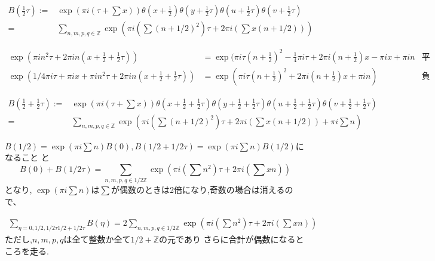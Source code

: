 \documentclass[uplatex,b5j,11pt]{jsbook}
\begin{document}
\begin{align*}
B\left(\frac{1}{2}\tau\right) := & \exp\left(\pi i (\tau + \sum x)\right)\theta(x+\frac{1}{2})\theta(y+\frac{1}{2}\tau)\theta(u+\frac{1}{2}\tau)\theta(v+\frac{1}{2}\tau) \\
 = &\sum_{n,m,p,q \in \mathbb{Z}} \exp\left( \pi i \left(\sum (n+1/2)^2 \right) \tau + 2 \pi i \left(\sum x(n+ 1/2) \right) \right)
\end{align*}

\begin{align*}
\exp( \pi i n^2 \tau + 2 \pi i n(x+\frac{1}{2}+\frac{1}{2}\tau)) & = \exp(\pi i \tau(n+\frac{1}{2})^2 - \frac{1}{4} \pi i \tau  + 2\pi i (n+ \frac{1}{2})x - \pi i x + \pi in & \mbox{平方完成}\\
\exp(1/4 \pi i \tau + \pi i x +  \pi i n^2 \tau + 2 \pi i n(x+ \frac{1}{2}+\frac{1}{2}\tau)) & = \exp(\pi i \tau(n+ \frac{1}{2})^2   + 2\pi i (n+ \frac{1}{2})x  + \pi in) & \mbox{負の項を移項}
\end{align*}

\begin{align*}
B\left( \frac{1}{2}+\frac{1}{2}\tau\right) := & \exp\left(\pi i (\tau + \sum x)\right)\theta(x+\frac{1}{2} + \frac{1}{2}\tau)\theta(y+\frac{1}{2}+\frac{1}{2}\tau)\theta(u+\frac{1}{2}+\frac{1}{2}\tau)\theta(v+\frac{1}{2}+\frac{1}{2}\tau) \\
 = &\sum_{n,m,p,q \in \mathbb{Z}} \exp\left( \pi i \left(\sum (n+1/2)^2 \right) \tau + 2 \pi i \left(\sum x(n+ 1/2) \right) +  \pi i \sum n \right)
\end{align*}

$B(1/2) = \exp(\pi i \sum n)B(0), B(1/2+1/2 \tau) =  \exp(\pi i \sum n)B(1/2)$になること
と
\begin{equation*}
B(0) + B(1/2\tau) = \sum_{n,m,p,q \in 1/2 \mathbb{Z}}  \exp\left( \pi i \left(\sum n^2 \right) \tau + 2 \pi i \left(\sum xn \right) \right)
\end{equation*}
となり,
$\exp(\pi i \sum n)$は$\sum$が偶数のときは2倍になり,奇数の場合は消えるので、

\begin{align*}
\sum_{\eta = 0, 1/2, 1/2\tau 1/2 + 1/2\tau} B(\eta) = 2 \sum_{n,m,p,q \in 1/2 \mathbb{Z}}  \exp\left( \pi i \left(\sum n^2 \right) \tau + 2 \pi i \left(\sum xn \right) \right)
\end{align*}
ただし,$n,m,p,q$は全て整数か全て$1/2 + \mathbb{Z}$の元であり
さらに合計が偶数になるところを走る.
\end{document}
